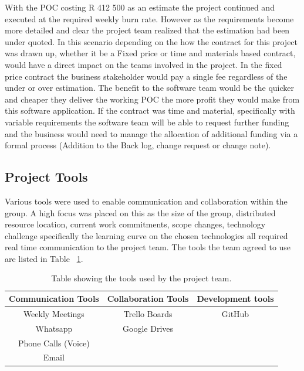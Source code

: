 \documentclass[12pt]{witseiepaper}
\begin{document}
With the POC costing R 412 500 as an estimate the project continued and executed at the required weekly burn rate. However as the requirements become more detailed and clear the project team realized that the estimation had been under quoted. In this scenario depending on the how the contract for this project was drawn up, whether it be a Fixed price or time and materials based contract, would have a direct impact on the teams involved in the project. In the fixed price contract the business stakeholder would pay a single fee regardless of the under or over estimation. The benefit to the software team would be the quicker and cheaper they deliver the working POC the more profit they would make from this software application. If the contract was time and material, specifically with variable requirements the software team will be able to request further funding and the business would need to manage the allocation of additional funding via a formal process (Addition to the Back log, change request or change note).

\subsection{Project Tools}
Various tools were used to enable communication and collaboration within the
group. A high focus was placed on this as the size of the group, distributed resource location, current work commitments, scope changes, technology challenge specifically the learning curve on the chosen technologies all required real time communication to the project team. The tools the team agreed to use are listed in Table ~\ref{tbl:Tools}.

\begin{table}[htb] \caption{Table showing the tools used by the project team.} \label{tbl:Tools} 
	\begin{center}
		\begin{tabular}
			{|c|c|c|} %
			\hline Communication Tools & Collaboration Tools & Development tools \\
			\hline Weekly Meetings &  Trello Boards & GitHub\\
			\hline Whatsapp & Google Drives &\\
			\hline Phone Calls (Voice) &&\\
			\hline Email &&\\
			\hline 
		\end{tabular}
	\end{center}
\end{table}
\end{document}
